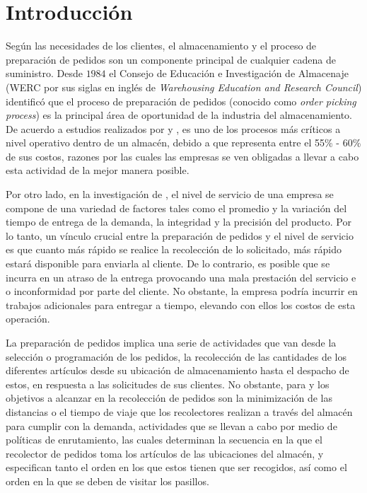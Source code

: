 \documentclass[preprint,12pt, pdftex]{elsarticle}
\begin{document}
\section{Introducción} \label{introduccion}
Según las necesidades de los clientes, el almacenamiento y el proceso de preparación de pedidos son un componente principal de cualquier cadena de suministro. Desde $1984$ el Consejo de Educación e Investigación de Almacenaje (WERC por sus siglas en inglés de \textit{Warehousing Education and Research Council}) \citep{Goetschalckx1988} identificó que el proceso de preparación de pedidos (conocido como \textit{order picking process}) es la principal área de oportunidad de la industria del almacenamiento. De acuerdo a estudios realizados por \citet{Tompkins2010} y \citet{Henn2013}, es uno de los procesos más críticos a nivel operativo dentro de un almacén, debido a que representa entre el 55\% - 60\% de sus costos, razones por las cuales las empresas se ven obligadas a llevar a cabo esta actividad de la mejor manera posible.

Por otro lado, en la investigación de \citet{Goetschalckx1989}, el nivel de servicio de una empresa se compone de una variedad de factores tales como el promedio y la variación del tiempo de entrega de la demanda, la integridad y la precisión del producto. Por lo tanto, un vínculo crucial entre la preparación de pedidos y el nivel de servicio es que cuanto más rápido se realice la recolección de lo solicitado, más rápido estará disponible para enviarla al cliente. De lo contrario, es posible que se incurra en un atraso de la entrega provocando una mala prestación del servicio e o inconformidad por parte del cliente. No obstante, la empresa podría incurrir en trabajos adicionales para entregar a tiempo, elevando con ellos los costos de esta operación.

La preparación de pedidos implica una serie de actividades que van desde la selección o programación de los pedidos, la recolección de las cantidades de los diferentes artículos desde su ubicación de almacenamiento hasta el despacho de estos, en respuesta a las solicitudes de sus clientes. No obstante, para \citet{Davarzani2016} y \citet{DeKoster2007} los objetivos a alcanzar en la recolección de pedidos son la minimización de las distancias o el tiempo de viaje que los recolectores realizan a través del almacén para cumplir con la demanda, actividades que se llevan a cabo por medio de políticas de enrutamiento, las cuales determinan la secuencia en la que el recolector de pedidos toma los artículos de las ubicaciones del almacén, y especifican tanto el orden en los que estos tienen que ser recogidos, así como el orden en la que se deben de visitar los pasillos. 
\end{document}
